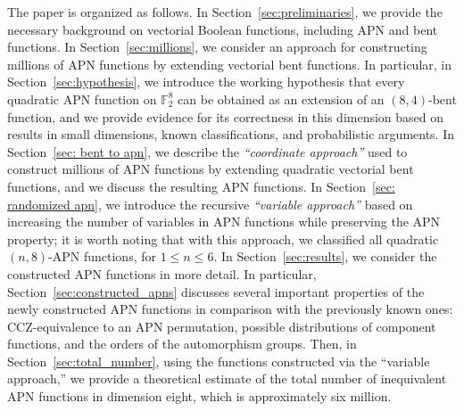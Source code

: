 \documentclass{amsart}[11pt]
\theoremstyle{plain}
\theoremstyle{definition}
\numberwithin{theorem}{section}
\numberwithin{equation}{section}
\numberwithin{table}{section}
\numberwithin{figure}{section}
\numberwithin{algorithm}{section}
\begin{document}
The paper is organized as follows. In Section~\ref{sec:preliminaries}, we provide the necessary background on vectorial Boolean functions, including APN and bent functions. In Section~\ref{sec:millions}, we consider an approach for constructing millions of APN functions by extending vectorial bent functions. In particular, in Section~\ref{sec:hypothesis}, we introduce the working hypothesis that every quadratic APN function on $\mathbb{F}_2^8$ can be obtained as an extension of an $(8,4)$-bent function, and we provide evidence for its correctness in this dimension based on results in small dimensions, known classifications, and probabilistic arguments. In Section~\ref{sec: bent to apn}, we describe the \emph{``coordinate approach''} used to construct millions of APN functions by extending quadratic vectorial bent functions, and we discuss the resulting APN functions. In Section~\ref{sec: randomized apn}, we introduce the recursive \emph{``variable approach''} based on increasing the number of variables in APN functions while preserving the APN property; it is worth noting that with this approach, we classified all quadratic $(n,8)$-APN functions, for $1\le n\le 6$. In Section~\ref{sec:results}, we consider the constructed APN functions in more detail. In particular, Section~\ref{sec:constructed_apns} discusses several important properties of the newly constructed APN functions in comparison with the previously known ones: CCZ-equivalence to an APN permutation, possible distributions of component functions, and the orders of the automorphism groups. Then, in Section~\ref{sec:total_number}, using the functions constructed via the ``variable approach,'' we provide a theoretical estimate of the total number of inequivalent APN functions in dimension eight, which is approximately six million.
\end{document}
